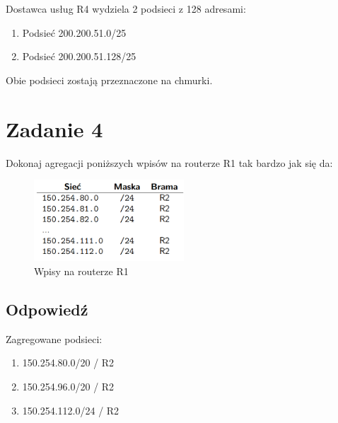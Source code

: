 \documentclass[polish, a4paper]{article}
\begin{document}
Dostawca usług R4 wydziela 2 podsieci z 128 adresami:
\begin{enumerate}
\item{Podsieć 200.200.51.0/25}
\item{Podsieć 200.200.51.128/25}
\end{enumerate}

Obie podsieci zostają przeznaczone na chmurki.

\section{Zadanie 4}

Dokonaj agregacji poniższych wpisów na routerze R1 tak bardzo jak się da:

\begin{figure}[H]
\centering
\includegraphics[width=0.5\textwidth]{wpisy router.png}
\caption{Wpisy na routerze R1}
\end{figure}

\subsection{Odpowiedź}

Zagregowane podsieci:
\begin{enumerate}
\item{150.254.80.0/20 / R2}
\item{150.254.96.0/20 / R2}
\item{150.254.112.0/24 / R2}
\end{enumerate}
\end{document}
